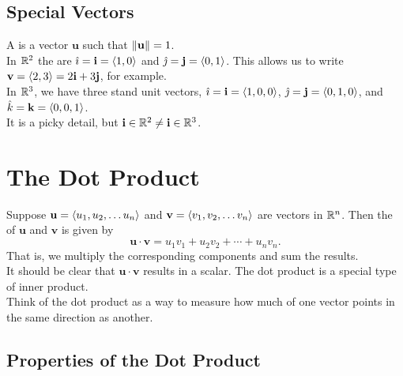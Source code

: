 \subsection{Special Vectors}

A  is a vector \(\mathbf{u}\) such that \(\left\lVert \mathbf{u}\right\rVert = 1\). \\

In \(\mathbb{R}^{2}\) the  are \(\hat{\imath} = \mathbf{i} = \left\langle 1,0 \right\rangle\) and \(\hat{\jmath} = \mathbf{j} = \left\langle 0,1 \right\rangle\). This allows us to write \(\mathbf{v} = \left\langle 2,3 \right\rangle = 2\mathbf{i} + 3\mathbf{j}\), for example. \\

In \(\mathbb{R}^{3}\), we have three stand unit vectors, \(\hat{\imath} = \mathbf{i} = \left\langle 1,0,0 \right\rangle\), \(\hat{\jmath} = \mathbf{j} = \left\langle 0,1,0 \right\rangle\), and \(\hat{k} = \mathbf{k} = \left\langle 0,0,1 \right\rangle\).  \\

It is a picky detail, but \(\mathbf{i} \in \mathbb{R}^{2} \ne \mathbf{i} \in \mathbb{R}^{3}\). 

\newpage

\section{The Dot Product}

Suppose \(\mathbf{u} = \left\langle u_{1},u_{2},\dots u_{n} \right\rangle\) and \(\mathbf{v} = \left\langle v_{1},v_{2},\dots v_{n} \right\rangle\) are vectors in \(\mathbb{R}^{n}\). Then the  of \(\mathbf{u}\) and \(\mathbf{v}\) is given by
\[
    \mathbf{u} \cdot \mathbf{v} = u_{1}v_{1} + u_{2}v_{2} + \cdots + u_{n}v_{n}.
\]
That is, we multiply the corresponding components and sum the results. \\

It should be clear that \(\mathbf{u} \cdot \mathbf{v}\) results in a scalar. The dot product is a special type of inner product. \\

Think of the dot product as a way to measure how much of one vector points in the same direction as another.

\subsection{Properties of the Dot Product}

